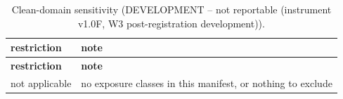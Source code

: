 \begingroup\footnotesize
\begin{longtable}{>{\raggedright\arraybackslash}p{126.4pt}>{\raggedright\arraybackslash}p{304.6pt}}
\caption{Clean-domain sensitivity (DEVELOPMENT -- not reportable (instrument v1.0F, W3 post-registration development)).} \\
\toprule
\textbf{restriction} & \textbf{note} \\
\midrule
\endfirsthead
\toprule
\textbf{restriction} & \textbf{note} \\
\midrule
\endhead
\bottomrule
\endfoot
not applicable & no exposure classes in this manifest, or nothing to exclude \\
\end{longtable}
\endgroup
